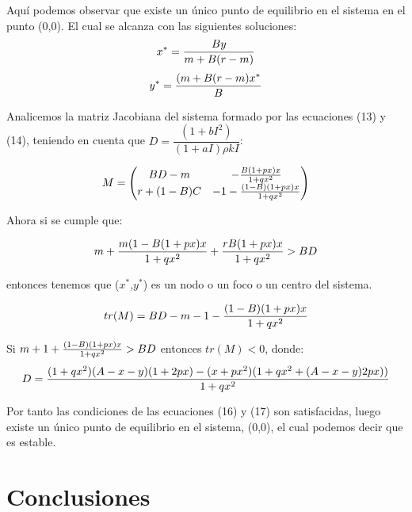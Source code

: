 \documentclass{article}
\begin{document}
Aqu\'i podemos observar que existe un \'unico punto de equilibrio en el sistema en el punto (0,0). El cual se alcanza con las siguientes soluciones: $$x^*={By\over m+B(r-m)}$$ $$y^*={(m+B(r-m)x^*\over B}$$

Analicemos la matriz Jacobiana del sistema formado por las ecuaciones (13) y (14), teniendo en cuenta que $D = \dfrac{(1+bI^2)}{(1+aI)\rho kI}$:

\begin{equation}
	M=\left(
	\begin{matrix}
		 BD-m & -{B(1+px)x\over 1+qx^2}\\
		 r+(1-B)C & -1-{(1-B)(1+px)x\over 1+qx^2}
	\end{matrix}
	\right)
\end{equation}

Ahora si se cumple que:

\begin{equation}
m+{m(1-B(1+px)x\over 1+qx^2}+{rB(1+px)x\over 1+qx^2}>BD
\end{equation}

entonces tenemos que ($x^*$,$y^*$) es un nodo o un foco o un centro del sistema.

\begin{equation}
	tr(M)=BD-m-1-{(1-B)(1+px)x\over 1+qx^2}
\end{equation}

Si $m+1+{(1-B)(1+px)x\over 1+qx^2}>BD$ entonces $tr(M)<0$, donde:
$$D={(1+qx^2)(A-x-y)(1+2px)-(x+px^2)(1+qx^2+(A-x-y)2px))\over 1+qx^2}$$

Por tanto las condiciones de las ecuaciones (16) y (17) son satisfacidas, luego existe un \'unico punto de equilibrio en el sistema, (0,0), el cual podemos decir que es estable. 
	
\section{Conclusiones}
\end{document}
